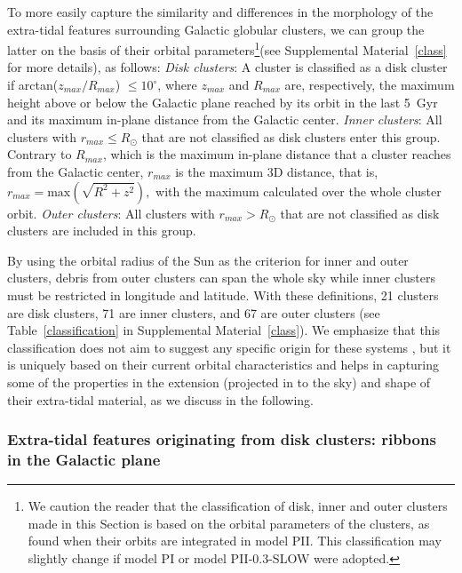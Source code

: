         To more easily capture the similarity and differences in the morphology of the extra-tidal features surrounding Galactic globular clusters, we can group the latter on the basis of their orbital parameters\footnote{We caution the reader that the classification of disk, inner and outer clusters made in this Section is based on the orbital parameters of the clusters, as found when their orbits are integrated in model PII. This classification may slightly change if model PI or model PII-0.3-SLOW were adopted.}(see Supplemental Material~\ref{class} for more details), as follows: \emph{Disk clusters}: A cluster is classified as a disk cluster if arctan($z_{max}/R_{max}$) $\le 10^\circ$, where $z_{max}$ and $R_{max}$ are, respectively, the maximum height above or below the Galactic plane reached by its orbit in the last 5~Gyr and its maximum in-plane distance from the Galactic center. \emph{Inner clusters}: All clusters with $r_{max} \le R_{\odot}$ that are not classified as disk clusters enter this group. Contrary to $R_{max}$, which is the maximum in-plane distance that a cluster reaches from the Galactic center, $r_{max}$ is the maximum 3D distance, that is, $r_{max} = \textrm{max}(\sqrt{R^2+z^2}),$ with the maximum calculated over the whole cluster orbit. \emph{Outer clusters}: All clusters with $r_{max} > R_{\odot}$ that are not classified as disk clusters are included in this group. 

        By using the orbital radius of the Sun as the criterion for inner and outer clusters, debris from outer clusters can span the whole sky while inner clusters must be restricted in longitude and latitude. With these definitions, 21 clusters are disk clusters, 71 are inner clusters, and 67 are outer clusters (see  Table~\ref{classification} in Supplemental Material~\ref{class}). We emphasize that this classification does not aim to suggest any specific origin for these systems \citep[e.g., whether they are in-situ or accreted, see][]{2019A&A...630L...4M}, but it is uniquely based on their current orbital characteristics and helps in capturing some of the properties in the extension (projected in to the sky) and shape of their extra-tidal material, as we discuss in the following.

        \subsubsection{Extra-tidal features originating from disk clusters: ribbons in the Galactic plane}

